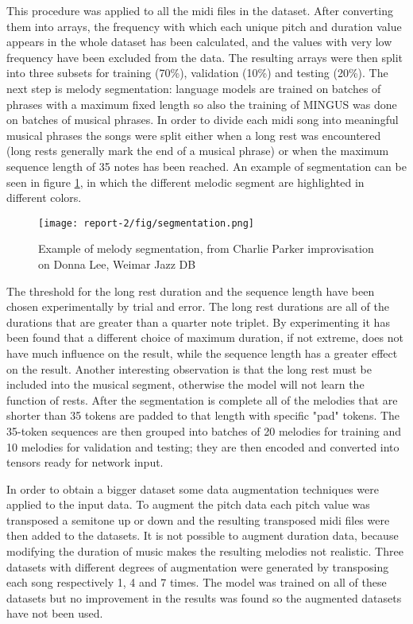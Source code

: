 \documentclass{article}
\begin{document}
This procedure was applied to all the midi files in the dataset. After converting them into arrays, the frequency with which each unique pitch and duration value appears in the whole dataset has been calculated, and the values with very low frequency have been excluded from the data. 
The resulting arrays were then split into three subsets for training (70\%), validation (10\%) and testing (20\%). The next step is melody segmentation: language models are trained on batches of phrases with a maximum fixed length so also the training of MINGUS was done on batches of musical phrases. In order to divide each midi song into meaningful musical phrases the songs were split either when a long rest was encountered (long rests generally mark the end of a musical phrase) or when the maximum sequence length of 35 notes has been reached. An example of segmentation can be seen in figure \ref{fig:segmentation}, in which the different melodic segment are highlighted in different colors.

\begin{figure}[!ht]
    \centering
    \texttt{[image: report-2/fig/segmentation.png]}
    \caption{Example of melody segmentation, from Charlie Parker improvisation on Donna Lee, Weimar Jazz DB} 
    \label{fig:segmentation}
\end{figure}

The threshold for the long rest duration and the sequence length have been chosen experimentally by trial and error. The long rest durations are all of the durations that are greater than a quarter note triplet. By experimenting it has been found that a different choice of maximum duration, if not extreme, does not have much influence on the result, while the sequence length has a greater effect on the result. Another interesting observation is that the long rest must be included into the musical segment, otherwise the model will not learn the function of rests.
After the segmentation is complete all of the melodies that are shorter than 35 tokens are padded to that length with specific "pad" tokens. The 35-token sequences are then grouped into batches of 20 melodies for training and 10 melodies for validation and testing; they are then encoded and converted into tensors ready for network input. 

In order to obtain a bigger dataset some data augmentation techniques were applied to the input data. To augment the pitch data each pitch value was transposed a semitone up or down and the resulting transposed midi files were then added to the datasets. It is not possible to augment duration data, because modifying the duration of music makes the resulting melodies not realistic. 
Three datasets with different degrees of augmentation were generated by transposing each song respectively 1, 4 and 7 times. The model was trained on all of these datasets but no improvement in the results was found so the augmented datasets have not been used.
\end{document}
